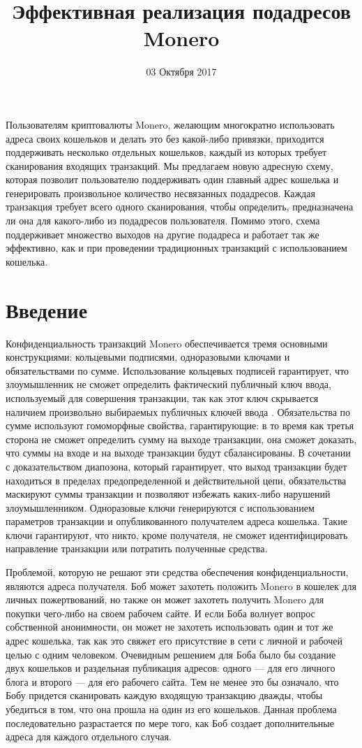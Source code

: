 \documentclass{mrl}
\title{Эффективная реализация подадресов Monero}
\date{03 Октября 2017}
\begin{document}
\begin{center}
{}
\end{center}

Пользователям криптовалюты Monero, желающим многократно использовать адреса своих кошельков и делать это без какой-либо привязки, приходится поддерживать несколько отдельных кошельков, каждый из которых требует сканирования входящих транзакций. Мы предлагаем новую адресную схему, которая позволит пользователю поддерживать один главный адрес кошелька и генерировать произвольное количество несвязанных подадресов. Каждая транзакция требует всего одного сканирования, чтобы определить, предназначена ли она для какого-либо из подадресов пользователя. Помимо этого, схема поддерживает множество выходов на другие подадреса и работает так же эффективно, как и при проведении традиционных транзакций с использованием кошелька.


\section{Введение}
Конфиденциальность транзакций Monero обеспечивается тремя основными конструкциями: кольцевыми подписями, одноразовыми ключами и обязательствами по сумме. Использование кольцевых подписей гарантирует, что злоумышленник не сможет определить фактический публичный ключ ввода, используемый для совершения транзакции, так как этот ключ скрывается наличием произвольно выбираемых публичных ключей ввода \cite{cryptonote}. Обязательства по сумме используют гомоморфные свойства, гарантирующие: в то время как третья сторона не сможет определить сумму на выходе транзакции, она сможет доказать, что суммы на входе и на выходе транзакции будут сбалансированы. В сочетании с доказательством диапозона, который гарантирует, что выход транзакции будет находиться в пределах предопределенной и действительной цепи, обязательства маскируют суммы транзакции и позволяют избежать каких-либо нарушений злоумышленником. Одноразовые ключи генерируются с использованием параметров транзакции и опубликованного получателем адреса кошелька. Такие ключи гарантируют, что никто, кроме получателя, не сможет идентифицировать направление транзакции или потратить полученные средства.

Проблемой, которую не решают эти средства обеспечения конфиденциальности, являются адреса получателя. Боб может захотеть положить Monero в кошелек для личных пожертвований, но также он может захотеть получить Monero для покупки чего-либо на своем рабочем сайте. И если Боба волнует вопрос собственной анонимности, он может не захотеть использовать один и тот же адрес кошелька, так как это свяжет его присутствие в сети с личной и рабочей целью с одним человеком. Очевидным решением для Боба было бы создание двух кошельков и раздельная публикация адресов: одного — для его личного блога и второго — для его рабочего сайта. Тем не менее это бы означало, что Бобу придется сканировать каждую входящую транзакцию дважды, чтобы убедиться в том, что она прошла на один из его кошельков. Данная проблема последовательно разрастается по мере того, как Боб создает дополнительные адреса для каждого отдельного случая.
\end{document}
